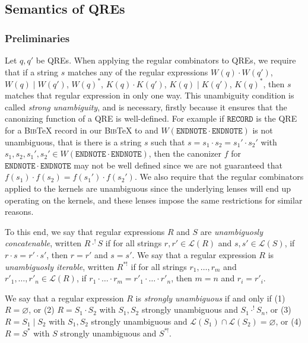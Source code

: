 \documentclass{svproc}
\newcommand{\sep}{\ensuremath{\; | \;}}
\newcommand{\bibtex}{\textsc{Bib}\TeX{}}
\begin{document}
\subsection{Semantics of QREs}
\subsubsection{Preliminaries}
Let $q, q'$ be QREs. When applying the regular combinators to QREs, we require
that if a string $s$ matches any of the regular expressions $W(q) \cdot W(q')$,
$W(q) \sep W(q')$, $W(q)^*$, $K(q) \cdot K(q')$,
$K(q) \sep K(q')$, $K(q)^*$, then $s$ matches that regular expression in
only one way. This unambiguity condition is called {\em strong unambiguity},
and is necessary, firstly because it ensures that the canonizing function of a
QRE is well-defined. For example if $\mathtt{RECORD}$ is the QRE for a \bibtex
record in our \bibtex{} to and $W(\mathtt{ENDNOTE} \cdot \mathtt{ENDNOTE})$ is not
unambiguous, that is there is a string $s$ such that $s = s_1 \cdot s_2 =
{s_1}' \cdot {s_2}'$ with $s_1, s_2, {s_1}', {s_2}' \in W(\mathtt{ENDNOTE} \cdot
\mathtt{ENDNOTE})$, then the canonizer $f$ for $\mathtt{ENDNOTE} \cdot
\mathtt{ENDNOTE}$ may not be well defined since we are not guaranteed that
$f(s_1) \cdot f(s_2) = f({s_1}') \cdot f({s_2}')$. We also require that the
regular combinators applied to the kernels are unambiguous since the underlying
lenses will end up operating on the kernels, and these lenses impose the same
restrictions for similar reasons.

To this end, we say that regular expressions $R$ and $S$ are
\textit{unambiguosly concatenable}, written $R \cdot^! S$ if for all strings
$r, r' \in \mathcal{L}(R)$ and $s, s' \in \mathcal{L}(S)$, if $r \cdot s = r'
\cdot s'$, then $r = r'$ and $s = s'$. We say that a regular expression $R$ is
\textit{unambiguosly iterable}, written $R^{*!}$ if for all strings $r_1,
\ldots, r_m$ and $r'_1, \ldots, r'_n \in \mathcal{L}(R)$, if $r_1 \cdot \ldots
\cdot r_m = r'_1 \cdot \ldots \cdot r'_n$, then $m = n$ and $r_i = r'_i$.

We say that a regular expression $R$ is \textit{strongly unambiguous} if and
only if (1) $R = \varnothing$, or (2) $R = S_1 \cdot S_2$ with $S_1, S_2$
strongly unambiguous and $S_1 \cdot^! S_n$, or (3) $R = S_1 \sep S_2$ with
$S_1, S_2$ strongly unambiguous and $\mathcal{L}(S_1) \cap \mathcal{L}(S_2) =
\varnothing$, or (4) $R = S^*$ with $S$ strongly unambiguous and $S^{*!}$.
\end{document}
